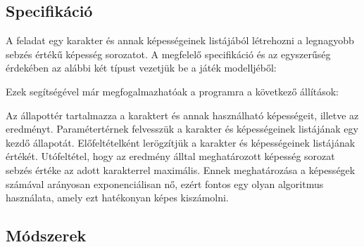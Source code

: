 \documentclass[12pt]{article}
\begin{document}
\subsection{Specifikáció}

A feladat egy karakter és annak képességeinek listájából létrehozni a legnagyobb sebzés értékű képesség sorozatot. A megfelelő specifikáció és az egyszerűség érdekében az alábbi két típust vezetjük be a játék modelljéből:

\vspace{1.5em}
\noindent{}
\vspace{1em}

Ezek segítségével már megfogalmazhatóak a programra a következő állítások:

\vspace{1cm}
\noindent{} \vspace{1em}

Az állapottér tartalmazza a karaktert és annak használható képességeit, illetve az eredményt. Paramétertérnek felvesszük a karakter és képességeinek listájának egy kezdő állapotát.
Előfeltételként lerögzítjük a karakter és képességeinek listájának értékét.
Utófeltétel, hogy az eredmény álltal meghatározott képesség sorozat sebzés értéke az adott karakterrel maximális. 
Ennek meghatározása a képességek számával arányosan exponenciálisan nő, ezért fontos egy olyan algoritmus használata, amely ezt hatékonyan képes kiszámolni.

\subsection{Módszerek}
\end{document}

